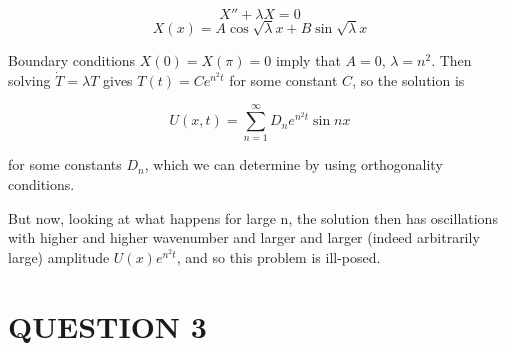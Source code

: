 \documentclass[a4paper]{article}
\begin{document}
\[ X'' + \lambda X = 0 \]
\[ X(x) = A \cos \sqrt{\lambda} x + B \sin \sqrt{\lambda} x \]

Boundary conditions $ X(0) = X(\pi) = 0 $ imply that $ A = 0 $, $ \lambda = n^{2} $. Then solving $ \dot{T} = \lambda T $ gives $ T(t) = C e^{n^{2} t} $ for some constant $ C $, so the solution is 

\[ U(x,t) = \sum_{n=1}^{\infty} D_{n} e^{n^{2}t} \sin n x  \]

for some constants $ D_{n} $, which we can determine by using orthogonality conditions. 

But now, looking at what happens for large n, the solution then has oscillations with higher and higher wavenumber and larger and larger (indeed arbitrarily large) amplitude $ U(x) e^{n^{2}t} $, and so this problem is ill-posed.

\section{QUESTION 3}
\end{document}

